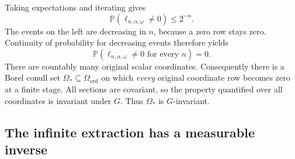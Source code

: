 \documentclass[11pt,a4paper]{article}
\numberwithin{equation}{section}
\newcommand{\Prob}{\mathbb P}
\begin{document}
Taking expectations and iterating gives
\begin{equation}\label{eq:survival}
 \Prob(\ell_{n,\alpha,\omega}\ne0)\leq2^{-n}.
\end{equation}
The events on the left are decreasing in $n$, because a zero row stays
zero. Continuity of probability for decreasing events therefore yields
\[
 \Prob(\ell_{n,\alpha,\omega}\ne0\text{ for every }n)=0.
\]
There are countably many original scalar coordinates. Consequently
there is a Borel conull set $\Omega_*\subseteq\Omega_{\mathrm{ord}}$
on which \emph{every} original coordinate row becomes zero at a finite
stage. All sections are covariant, so the property quantified over all
coordinates is invariant under $G$. Thus $\Omega_*$ is $G$-invariant.

\subsection{The infinite extraction has a measurable inverse}
\end{document}
